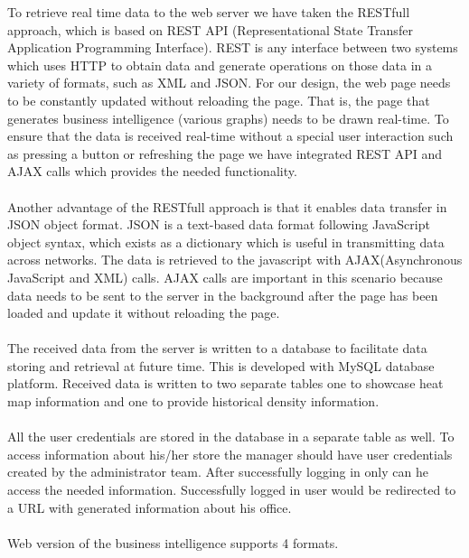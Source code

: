 \documentclass[12pt,a4paper]{report}
\begin{document}
To retrieve real time data to the web server we have taken the RESTfull approach, which is based on REST API (Representational State Transfer Application Programming Interface). REST is any interface between two systems which uses HTTP to obtain data and generate operations on those data in a variety of formats, such as XML and JSON. For our design, the web page needs to be constantly updated without reloading the page. That is, the page that generates business intelligence (various graphs) needs to be drawn real-time. To ensure that the data is received real-time without a special user interaction such as pressing a button or refreshing the page we have integrated REST API and AJAX calls which provides the needed functionality.\\\\
Another advantage of the RESTfull approach is that it enables data transfer in JSON object format. JSON is a text-based data format following JavaScript object syntax, which exists as a dictionary which is useful in transmitting data across networks. The data is retrieved to the javascript with AJAX(Asynchronous JavaScript and XML) calls. AJAX calls are important in this scenario because data needs to be sent to the server in the background after the page has been loaded and update it without reloading the page.\\\\
The received data from the server is written to a database to facilitate data storing and retrieval at future time. This is developed with MySQL database platform. Received data is written to two separate tables one to showcase heat map information and one to provide historical density information. \\\\
All the user credentials are stored in the database in a separate table as well. To access information about his/her store the manager should have user credentials created by the administrator team. After successfully logging in only can he access the needed information. Successfully logged in user would be redirected to a URL with generated information about his office.\\\\
Web version of the business intelligence supports 4 formats.
\end{document}
